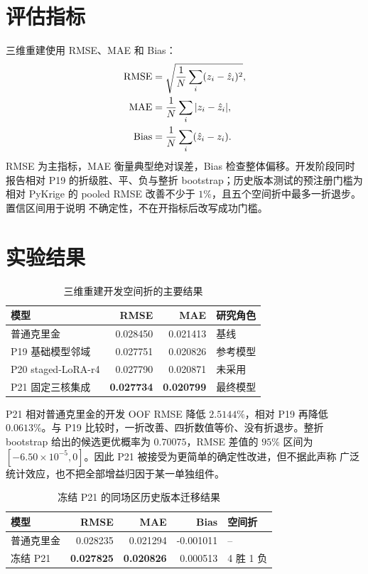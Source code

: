\section{评估指标}

三维重建使用 RMSE、MAE 和 Bias：
\begin{align}
  \mathrm{RMSE} &= \sqrt{\frac{1}{N}\sum_i(z_i-\hat{z}_i)^2},\\
  \mathrm{MAE} &= \frac{1}{N}\sum_i|z_i-\hat{z}_i|,\\
  \mathrm{Bias} &= \frac{1}{N}\sum_i(\hat{z}_i-z_i).
\end{align}
RMSE 为主指标，MAE 衡量典型绝对误差，Bias 检查整体偏移。开发阶段同时报告相对
P19 的折级胜、平、负与整折 bootstrap；历史版本测试的预注册门槛为相对 PyKrige
的 pooled RMSE 改善不少于 $1\%$，且五个空间折中最多一折退步。置信区间用于说明
不确定性，不在开指标后改写成功门槛。

\section{实验结果}

\begin{table}[htbp]
  \centering
  \caption{三维重建开发空间折的主要结果}
  \label{tab:reconstruction-development}
  \begin{tabular}{lrrl}
    \toprule
    模型 & RMSE & MAE & 研究角色 \\
    \midrule
    普通克里金 & 0.028450 & 0.021413 & 基线 \\
    P19 基础模型邻域 & 0.027751 & 0.020826 & 参考模型 \\
    P20 staged-LoRA-r4 & 0.027790 & 0.020871 & 未采用 \\
    P21 固定三核集成 & \textbf{0.027734} & \textbf{0.020799} & 最终模型 \\
    \bottomrule
  \end{tabular}
\end{table}

P21 相对普通克里金的开发 OOF RMSE 降低 $2.5144\%$，相对 P19 再降低
$0.0613\%$。与 P19 比较时，一折改善、四折数值等价、没有折退步。整折
bootstrap 给出的候选更优概率为 $0.70075$，RMSE 差值的 $95\%$ 区间为
$[-6.50\times10^{-5},0]$。因此 P21 被接受为更简单的确定性改进，但不据此声称
广泛统计效应，也不把全部增益归因于某一单独组件。

\begin{table}[htbp]
  \centering
  \caption{冻结 P21 的同场区历史版本迁移结果}
  \label{tab:reconstruction-transfer}
  \begin{tabular}{lrrrl}
    \toprule
    模型 & RMSE & MAE & Bias & 空间折 \\
    \midrule
    普通克里金 & 0.028235 & 0.021294 & -0.001011 & -- \\
    冻结 P21 & \textbf{0.027825} & \textbf{0.020826} & 0.000513 & 4 胜 1 负 \\
    \bottomrule
  \end{tabular}
\end{table}

